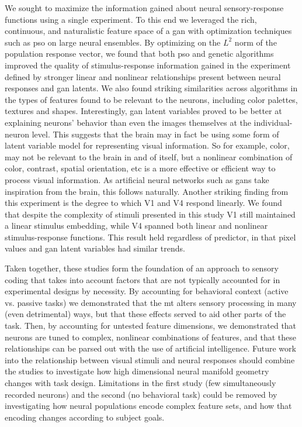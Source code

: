 We sought to maximize the information gained about neural sensory-response functions using a single experiment. To this end we leveraged the rich, continuous, and naturalistic feature space of a \gls{gan} with optimization techniques such as \gls{pso} on large neural ensembles. By optimizing on the $L^2$ norm of the population response vector, we found that both \gls{pso} and genetic algorithms improved the quality of stimulus-response information gained in the experiment defined by stronger linear and nonlinear relationships present between neural responses and \gls{gan} latents. We also found striking similarities across algorithms in the types of features found to be relevant to the neurons, including color palettes, textures and shapes. Interestingly, \gls{gan} latent variables proved to be better at explaining neurons' behavior than even the images themselves at the individual-neuron level. This suggests that the brain may in fact be using some form of latent variable model for representing visual information. So for example, color, may not be relevant to the brain in and of itself, but a nonlinear combination of color, contrast, spatial orientation, etc is a more effective or efficient way to process visual information. As artificial neural networks such as \gls{gan}s take inspiration from the brain, this follows naturally. Another striking finding from this experiment is the degree to which V1 and V4 respond linearly. We found that despite the complexity of stimuli presented in this study V1 still maintained a linear stimulus embedding, while V4 spanned both linear and nonlinear stimulus-response functions. This result held regardless of predictor, in that pixel values and \gls{gan} latent variables had similar trends. 

Taken together, these studies form the foundation of an approach to sensory coding that takes into account factors that are not typically accounted for in experimental designs by necessity. By accounting for behavioral context (active vs. passive tasks) we demonstrated that the \gls{mt} alters sensory processing in many (even detrimental) ways, but that these effects served to aid other parts of the task. Then, by accounting for untested feature dimensions, we demonstrated that neurons are tuned to complex, nonlinear combinations of features, and that these relationships can be parsed out with the use of artificial intelligence. Future work into the relationship between visual stimuli and neural responses should combine the studies to investigate how high dimensional neural manifold geometry changes with task design. Limitations in the first study (few simultaneously recorded neurons) and the second (no behavioral task) could be removed by investigating how neural populations encode complex feature sets, and how that encoding changes according to subject goals. 